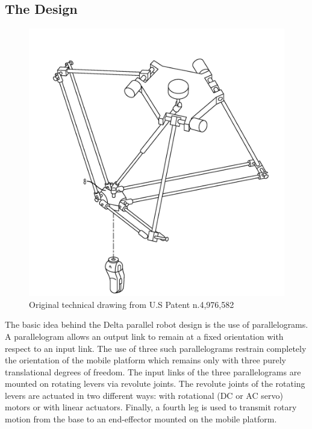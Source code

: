 \subsection{The Design}
\begin{figure}[H]
	\centering
	\includegraphics[width=\maxwidth{15cm}, keepaspectratio]{Chapters/Fig/deltarobot_first_design.png}
	\caption{Original technical drawing from U.S Patent n.4,976,582\cite{US_patent_deltarobot_thesis}}
	\label{fig:deltarobot_first_design}
\end{figure}

The basic idea behind the Delta parallel robot design is the use of parallelograms. A parallelogram allows an output link to remain at a fixed orientation with respect to an input link. The use of three such parallelograms restrain completely the orientation of the mobile platform which remains only with three purely translational degrees of freedom. The input links of the three parallelograms are mounted on rotating levers via revolute joints. The revolute joints of the rotating levers are actuated in two different ways: with rotational (DC or AC servo) motors or with linear actuators. Finally, a fourth leg is used to transmit rotary motion from the base to an end-effector mounted on the mobile platform\cite{intro_deltarobot_thesis}.

